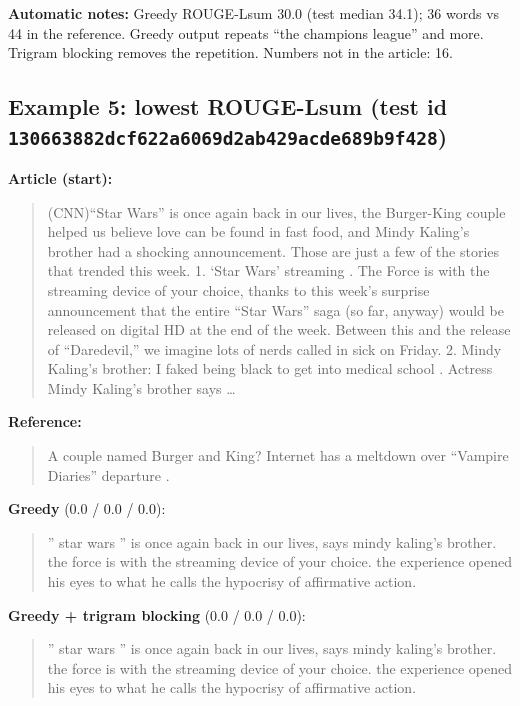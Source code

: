 \documentclass[10pt,a4paper]{article}
\begin{document}
\textbf{Automatic notes:} Greedy ROUGE-Lsum 30.0 (test median 34.1); 36 words vs 44 in the reference. Greedy output repeats ``the champions league'' and more. Trigram blocking removes the repetition. Numbers not in the article: 16.

\hypertarget{example-5-lowest-rouge-lsum-test-id-130663882dcf622a6069d2ab429acde689b9f428}{%
\subsection{\texorpdfstring{Example 5: lowest ROUGE-Lsum (test id \texttt{130663882dcf622a6069d2ab429acde689b9f428})}{Example 5: lowest ROUGE-Lsum (test id 130663882dcf622a6069d2ab429acde689b9f428)}}\label{example-5-lowest-rouge-lsum-test-id-130663882dcf622a6069d2ab429acde689b9f428}}

\textbf{Article (start):}

\begin{quote}
(CNN)``Star Wars'' is once again back in our lives, the Burger-King couple helped us believe love can be found in fast food, and Mindy Kaling's brother had a shocking announcement. Those are just a few of the stories that trended this week. 1. `Star Wars' streaming . The Force is with the streaming device of your choice, thanks to this week's surprise announcement that the entire ``Star Wars'' saga (so far, anyway) would be released on digital HD at the end of the week. Between this and the release of ``Daredevil,'' we imagine lots of nerds called in sick on Friday. 2. Mindy Kaling's brother: I faked being black to get into medical school . Actress Mindy Kaling's brother says \ldots{}
\end{quote}

\textbf{Reference:}

\begin{quote}
A couple named Burger and King?
Internet has a meltdown over ``Vampire Diaries'' departure .
\end{quote}

\textbf{Greedy} (0.0 / 0.0 / 0.0):

\begin{quote}
'' star wars '' is once again back in our lives, says mindy kaling's brother.
the force is with the streaming device of your choice.
the experience opened his eyes to what he calls the hypocrisy of affirmative action.
\end{quote}

\textbf{Greedy + trigram blocking} (0.0 / 0.0 / 0.0):

\begin{quote}
'' star wars '' is once again back in our lives, says mindy kaling's brother.
the force is with the streaming device of your choice.
the experience opened his eyes to what he calls the hypocrisy of affirmative action.
\end{quote}
\end{document}
